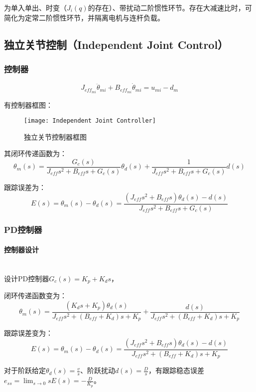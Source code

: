 \documentclass[
12pt, %
a4paper, 
oneside, %
headinclude,footinclude, %
]{scrartcl}
\begin{document}
为单入单出、时变（$ J_i(q) $的存在）、带扰动二阶惯性环节。存在大减速比时，可简化为定常二阶惯性环节，并隔离电机与连杆负载。
\subsection[独立关节控制]{独立关节控制（Independent Joint Control）}
\subsubsection[控制器]{控制器}
$$ J_{eff_{mi}}\ddot{\theta}_{mi} + B_{eff_{mi}}\dot{\theta}_{mi} = u_{mi} - d_m $$

有控制器框图：
\begin{figure}[H]
\centering 
\texttt{[image: Independent Joint Controller]} 
\caption[独立关节控制器框图]{独立关节控制器框图}
\end{figure}

其闭环传递函数为：
$$ \theta_m(s) = \frac{G_c(s)}{J_{eff}s^2 + B_{eff}s + G_c(s)}\theta_d(s) + \frac{1}{J_{eff}s^2 + B_{eff}s + G_c(s)}d(s) $$

跟踪误差为：
$$ E(s) = \theta_m(s) - \theta_d(s) = \frac{(J_{eff}s^2 + B_{eff}s)\theta_d(s) - d(s)}{J_{eff}s^2 + B_{eff}s + G_c(s)} $$
\subsubsection[PD控制器]{PD控制器}
\paragraph{控制器设计}~\\

设计PD控制器$ G_c(s) = K_p + K_d s $，

闭环传递函数变为：
$$ \theta_m(s) = \frac{(K_d s + K_p)\theta_d(s)}{J_{eff}s^2 + (B_{eff} + K_d)s + K_p} + \frac{d(s)}{J_{eff}s^2 + (B_{eff} + K_d)s + K_p} $$

跟踪误差变为：
$$ E(s) = \theta_m(s) - \theta_d(s) = \frac{(J_{eff}s^2 + B_{eff}s)\theta_d(s) - d(s)}{J_{eff}s^2 + (B_{eff} + K_d)s + K_p} $$

对于阶跃给定$ \theta_d(s) = \frac{v}{s} $、阶跃扰动$ d(s) = \frac{D}{s} $，有跟踪稳态误差$ e_{ss} = \lim_{s \to 0} sE(s) = -\frac{D}{K_p} $。
\end{document}
